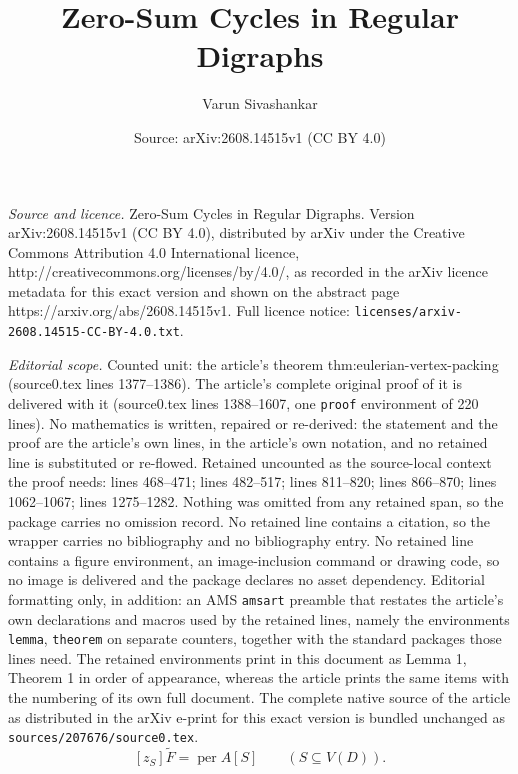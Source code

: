\documentclass[10pt,a4paper]{amsart}
\title{Zero-Sum Cycles in Regular Digraphs}
\author{Varun Sivashankar}
\date{Source: arXiv:2608.14515v1 (CC BY 4.0)}
\newcommand{\per}{\operatorname{per}}
\begin{document}
\maketitle

\noindent\emph{Source and licence.} Zero-Sum Cycles in Regular Digraphs. Version arXiv:2608.14515v1 (CC BY 4.0), distributed by arXiv under the Creative Commons Attribution 4.0 International licence, http://creativecommons.org/licenses/by/4.0/, as recorded in the arXiv licence metadata for this exact version and shown on the abstract page https://arxiv.org/abs/2608.14515v1. Full licence notice: \texttt{licenses/arxiv-2608.14515-CC-BY-4.0.txt}.\par\smallskip

\noindent\textit{Editorial scope.} Counted unit: the article's theorem thm:eulerian-vertex-packing (source0.tex lines 1377--1386). The article's complete original proof of it is delivered with it (source0.tex lines 1388--1607, one \texttt{proof} environment of 220 lines). No mathematics is written, repaired or re-derived: the statement and the proof are the article's own lines, in the article's own notation, and no retained line is substituted or re-flowed.  Retained uncounted as the source-local context the proof needs: lines 468--471; lines 482--517; lines 811--820; lines 866--870; lines 1062--1067; lines 1275--1282.  Nothing was omitted from any retained span, so the package carries no omission record.  No retained line contains a citation, so the wrapper carries no bibliography and no bibliography entry.  No retained line contains a figure environment, an image-inclusion command or drawing code, so no image is delivered and the package declares no asset dependency.  Editorial formatting only, in addition: an AMS \texttt{amsart} preamble that restates the article's own declarations and macros used by the retained lines, namely the environments \texttt{lemma}, \texttt{theorem} on separate counters, together with the standard packages those lines need.  The retained environments print in this document as Lemma 1, Theorem 1 in order of appearance, whereas the article prints the same items with the numbering of its own full document.  The complete native source of the article as distributed in the arXiv e-print for this exact version is bundled unchanged as \texttt{sources/207676/source0.tex}.
\begin{equation}\label{eq:cycle-cover-permanent}
  [z_S]\widetilde F=\per A[S]
  \qquad(S\subseteq V(D)).
\end{equation}
\end{document}
